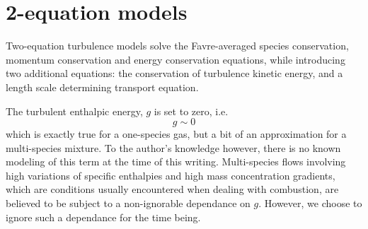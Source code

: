 \documentclass{warpdoc}
\begin{document}
\section{2-equation models}

Two-equation turbulence models solve the Favre-averaged
species conservation, momentum conservation and energy conservation
equations, while introducing two additional equations: the
conservation of turbulence kinetic energy, and a length scale
determining transport equation.

The turbulent enthalpic energy, $g$ is set to zero, i.e.
%
\begin{equation}
 g \sim 0
\end{equation}
%
which is exactly true for a one-species gas, but a
bit of an approximation for a multi-species mixture.
To the author's knowledge however, there is no known modeling of this
term at the time of this writing. Multi-species flows involving high
variations of specific enthalpies and high
mass concentration gradients, which are conditions usually encountered
when dealing with combustion, are believed to be subject to a
non-ignorable dependance on $g$. However, we choose to ignore
such a dependance for the time being.
\end{document}
